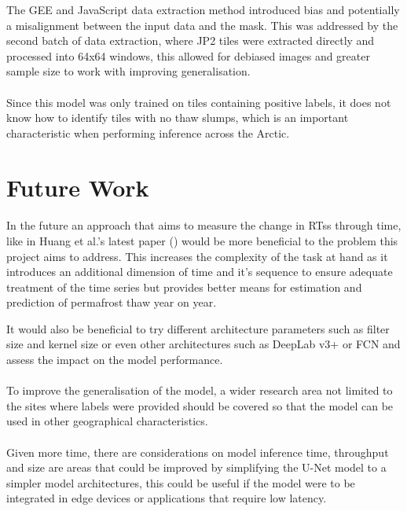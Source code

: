 The GEE and JavaScript data extraction method introduced bias and potentially a misalignment between the input data and the mask.  This was addressed by the second batch of data extraction, where JP2 tiles were extracted directly and processed into 64x64 windows, this allowed for debiased images and  greater sample size to work with improving generalisation.
\paragraph{}
Since this model was only trained on tiles containing positive labels, it does not know how to identify tiles with no thaw slumps, which is an important characteristic when performing inference across the Arctic. 
\section{Future Work}
\paragraph{}
In the future an approach that aims to measure the change in RTss through time, like in Huang et al.'s latest paper (\cite{HUANG2021102399}) would be more beneficial to the problem this project aims to address. This increases the complexity of the task at hand as it introduces an additional dimension of time and it's sequence to ensure adequate treatment of the time series but provides better means for estimation and prediction of permafrost thaw year on year.

It would also be beneficial to try different architecture parameters such as filter size and kernel size or even other architectures such as DeepLab v3+ or \gls{FCN} and assess the impact on the model performance.
\paragraph{}
To improve the generalisation of the model, a wider research area not limited to the sites where labels were provided should be covered so that the model can be used in other geographical characteristics.
\paragraph{}
Given more time, there are considerations on  model inference time, throughput and size are areas that could be improved by simplifying the U-Net model to a simpler model architectures, this could be useful if the model were to be integrated in edge devices or applications that require low latency.

